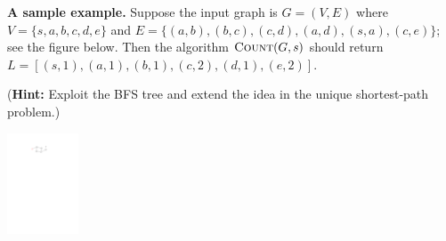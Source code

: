 \documentclass[11pt,twoside]{article}
\begin{document}
\textbf{A sample example.}
Suppose the input graph is $G = (V,E)$ where $V = \{s,a,b,c,d,e\}$ and $E = \{(a,b),(b,c),(c,d),(a,d),(s,a),(c,e)\}$; see the figure below.
Then the algorithm $\textsc{Count}(G,s)$ should return $L = [(s,1),(a,1),(b,1),(c,2),(d,1),(e,2)]$.

(\textbf{Hint:} Exploit the BFS tree and extend the idea in the unique shortest-path problem.)

\begin{center}
    \includegraphics[height=3cm]{fig-graph.pdf}
\end{center}
\end{document}

